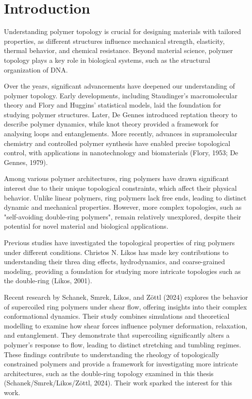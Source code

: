 \documentclass{article}      %
\begin{document}
\newpage

\section{Introduction}

Understanding polymer topology is crucial for designing materials with tailored properties, as different structures influence mechanical strength, elasticity, thermal behavior, and chemical resistance. Beyond material science, polymer topology plays a key role in biological systems, such as the structural organization of DNA.

Over the years, significant advancements have deepened our understanding of polymer topology. Early developments, including Staudinger’s macromolecular theory and Flory and Huggins’ statistical models, laid the foundation for studying polymer structures. Later, De Gennes introduced reptation theory to describe polymer dynamics, while knot theory provided a framework for analysing loops and entanglements. More recently, advances in supramolecular chemistry and controlled polymer synthesis have enabled precise topological control, with applications in nanotechnology and biomaterials (Flory, 1953; De Gennes, 1979).

Among various polymer architectures, ring polymers have drawn significant interest due to their unique topological constraints, which affect their physical behavior. Unlike linear polymers, ring polymers lack free ends, leading to distinct dynamic and mechanical properties. However, more complex topologies, such as "self-avoiding double-ring polymers", remain relatively unexplored, despite their potential for novel material and biological applications.

Previous studies have investigated the topological properties of ring polymers under different conditions. Christos N. Likos has made key contributions to understanding their threa    ding effects, hydrodynamics, and coarse-grained modeling, providing a foundation for studying more intricate topologies such as the double-ring (Likos, 2001).

Recent research by Schanek, Smrek, Likos, and Zöttl (2024) explores the behavior of supercoiled ring polymers under shear flow, offering insights into their complex conformational dynamics. Their study combines simulations and theoretical modelling to examine how shear forces influence polymer deformation, relaxation, and entanglement. They demonstrate that supercoiling significantly alters a polymer’s response to flow, leading to distinct stretching and tumbling regimes. These findings contribute to understanding the rheology of topologically constrained polymers and provide a framework for investigating more intricate architectures, such as the double-ring topology examined in this thesis (Schanek/Smrek/Likos/Zöttl, 2024). Their work sparked the interest for this work. 
\end{document}
